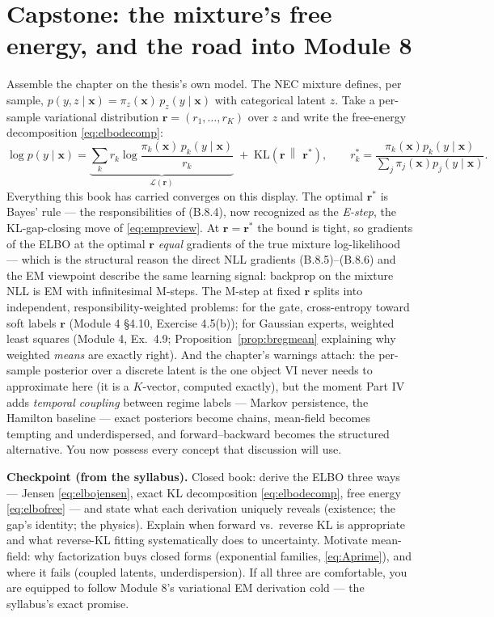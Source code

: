 \documentclass[11pt]{article}
\numberwithin{equation}{section}
\theoremstyle{plain}
\theoremstyle{definition}
\theoremstyle{remark}
\newcommand{\KL}[2]{\mathrm{KL}\!\left(#1 \,\middle\|\, #2\right)}
\newcommand{\x}{\bm{x}}
\newcommand{\ELBO}{\mathcal{L}}
\begin{document}
\section{Capstone: the mixture's free energy, and the road into Module 8}\label{sec:capstone}

Assemble the chapter on the thesis's own model. The NEC mixture defines, per sample, $p(y, z \mid \x) = \pi_z(\x)\, p_z(y \mid \x)$ with categorical latent $z$. Take a per-sample variational distribution $\bm r = (r_1, \dots, r_K)$ over $z$ and write the free-energy decomposition \eqref{eq:elbodecomp}:
\begin{equation}
\log p(y \mid \x)
= \underbrace{\sum_k r_k \log \frac{\pi_k(\x)\, p_k(y \mid \x)}{r_k}}_{\ELBO(\bm r)}
\;+\; \KL{\bm r}{\,\bm r^{\ast}},
\qquad
r^{\ast}_k = \frac{\pi_k(\x) p_k(y \mid \x)}{\sum_j \pi_j(\x) p_j(y \mid \x)} .
\label{eq:mixelbo}
\end{equation}
Everything this book has carried converges on this display. The optimal $\bm r^\ast$ is Bayes' rule --- the responsibilities of (B.8.4), now recognized as the \emph{E-step}, the KL-gap-closing move of \eqref{eq:empreview}. At $\bm r = \bm r^\ast$ the bound is tight, so gradients of the ELBO at the optimal $\bm r$ \emph{equal} gradients of the true mixture log-likelihood --- which is the structural reason the direct NLL gradients (B.8.5)--(B.8.6) and the EM viewpoint describe the same learning signal: backprop on the mixture NLL is EM with infinitesimal M-steps. The M-step at fixed $\bm r$ splits into independent, responsibility-weighted problems: for the gate, cross-entropy toward soft labels $\bm r$ (Module 4 \S4.10, Exercise 4.5(b)); for Gaussian experts, weighted least squares (Module 4, Ex.\ 4.9; Proposition~\ref{prop:bregmean} explaining why weighted \emph{means} are exactly right). And the chapter's warnings attach: the per-sample posterior over a discrete latent is the one object VI never needs to approximate here (it is a $K$-vector, computed exactly), but the moment Part IV adds \emph{temporal coupling} between regime labels --- Markov persistence, the Hamilton baseline --- exact posteriors become chains, mean-field becomes tempting and underdispersed, and forward--backward becomes the structured alternative. You now possess every concept that discussion will use.

\medskip
\noindent\textbf{Checkpoint (from the syllabus).} Closed book: derive the ELBO three ways --- Jensen \eqref{eq:elbojensen}, exact KL decomposition \eqref{eq:elbodecomp}, free energy \eqref{eq:elbofree} --- and state what each derivation uniquely reveals (existence; the gap's identity; the physics). Explain when forward vs.\ reverse KL is appropriate and what reverse-KL fitting systematically does to uncertainty. Motivate mean-field: why factorization buys closed forms (exponential families, \eqref{eq:Aprime}), and where it fails (coupled latents, underdispersion). If all three are comfortable, you are equipped to follow Module 8's variational EM derivation cold --- the syllabus's exact promise.
\end{document}
